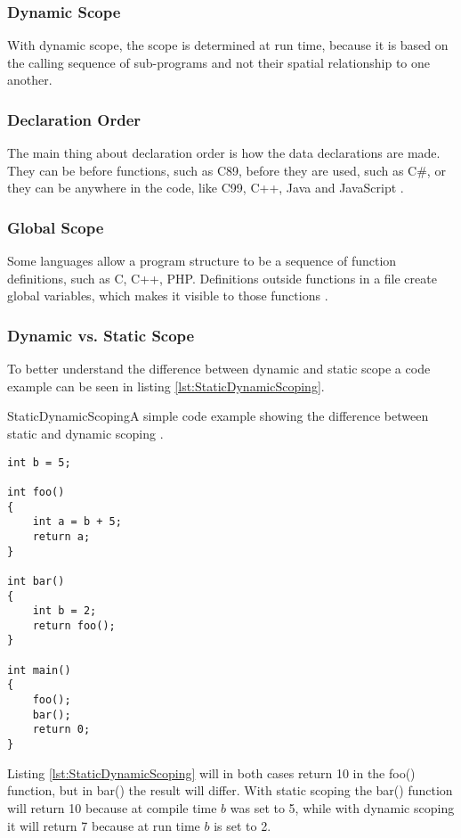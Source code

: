 \subsubsection{Dynamic Scope}
With dynamic scope, the scope is determined at run time, because it is based on the calling sequence of sub-programs and not their spatial relationship to one another.

\subsubsection{Declaration Order}
The main thing about declaration order is how the data declarations are made. They can be before functions, such as C89, before they are used, such as C\#, or they can be anywhere in the code, like C99, C++, Java and JavaScript \citep{sebesta}.

\subsubsection{Global Scope}
Some languages allow a program structure to be a sequence of function definitions, such as C, C++, PHP. Definitions outside functions in a file create global variables, which makes it visible to those functions \citep{sebesta}.

\subsubsection{Dynamic vs. Static Scope}
To better understand the difference between dynamic and static scope a code example can be seen in listing \ref{lst:StaticDynamicScoping}.
\begin{code}{StaticDynamicScoping}{A simple code example showing the difference between static and dynamic scoping \citep{StaticvsDynamic}.}
\begin{lstlisting}
int b = 5;

int foo()
{
	int a = b + 5;
	return a;
}

int bar()
{
	int b = 2;
	return foo();
}

int main()
{
	foo();
	bar();
	return 0;
}
\end{lstlisting}
\end{code}
Listing \ref{lst:StaticDynamicScoping} will in both cases return 10 in the foo() function, but in bar() the result will differ. With static scoping the bar() function will return 10 because at compile time $b$ was set to 5, while with dynamic scoping it will return 7 because at run time $b$ is set to 2.

